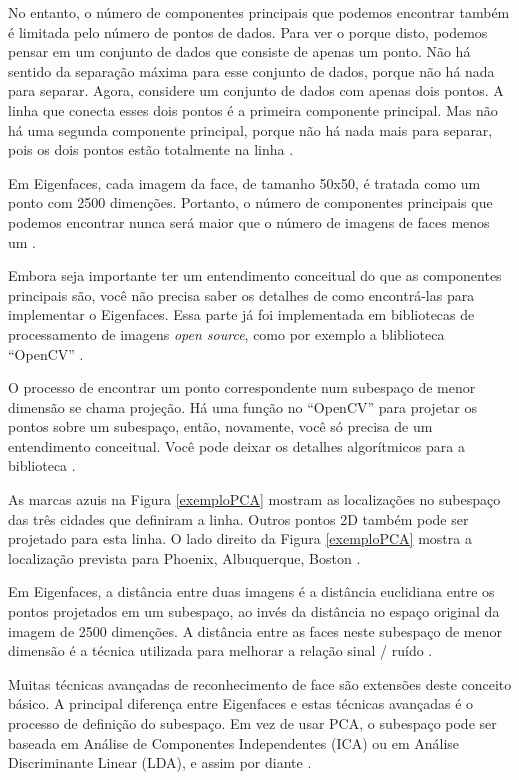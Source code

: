 No entanto, o número de componentes principais que podemos encontrar também é limitada pelo número de pontos de dados. Para ver o porque disto, podemos pensar em um conjunto de dados que consiste de apenas um ponto. Não há sentido da separação máxima para esse conjunto de dados, porque não há nada para separar. Agora, considere um conjunto de dados com apenas dois pontos. A linha que conecta esses dois pontos é a primeira componente principal. Mas não há uma segunda componente principal, porque não há nada mais para separar, pois os dois pontos estão totalmente na linha \cite{hewitt}.

Em Eigenfaces, cada imagem da face, de tamanho 50x50, é tratada como um ponto com 2500 dimenções. Portanto, o número de componentes principais que podemos encontrar nunca será maior que o número de imagens de faces menos um \cite{hewitt}.

Embora seja importante ter um entendimento conceitual do que as componentes principais são, você não precisa saber os detalhes de como encontrá-las para implementar o Eigenfaces. Essa parte já foi implementada em bibliotecas de processamento de imagens \textit{open source}, como por exemplo a bliblioteca ``OpenCV'' \cite{hewitt}.

O processo de encontrar um ponto correspondente num subespaço de menor dimensão se chama projeção. Há uma função no ``OpenCV'' para projetar os pontos sobre um subespaço, então, novamente, você só precisa de um entendimento conceitual. Você pode deixar os detalhes algorítmicos para a biblioteca \cite{hewitt}.

As marcas azuis na Figura \ref{exemploPCA} mostram as localizações no subespaço das três cidades que definiram a linha. Outros pontos 2D também pode ser projetado para esta linha. O lado direito da Figura \ref{exemploPCA} mostra a localização prevista para Phoenix, Albuquerque, Boston \cite{hewitt}.

Em Eigenfaces, a distância entre duas imagens é a distância euclidiana entre os pontos projetados em um subespaço, ao invés da distância no espaço original da imagem de 2500 dimenções. A distância entre as faces neste subespaço de menor dimensão é a técnica utilizada para melhorar a relação sinal / ruído \cite{hewitt}.

Muitas técnicas avançadas de reconhecimento de face são extensões deste conceito básico. A principal diferença entre Eigenfaces e estas técnicas avançadas é o processo de definição do subespaço. Em vez de usar PCA, o subespaço pode ser baseada em Análise de Componentes Independentes (ICA) ou em Análise Discriminante Linear (LDA), e assim por diante \cite{hewitt}.

